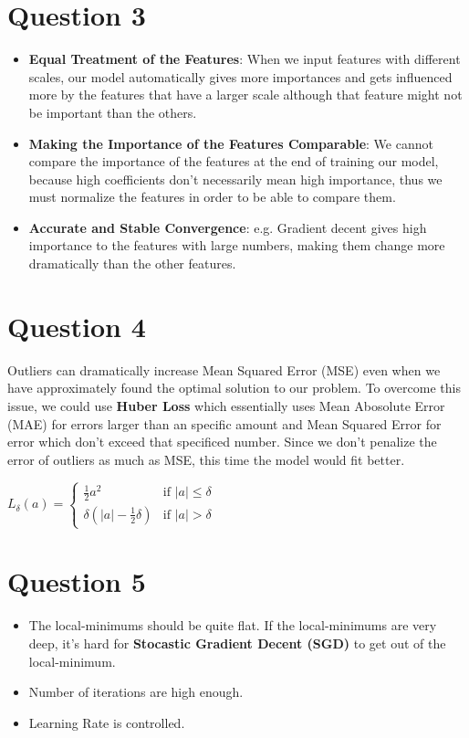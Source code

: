 \documentclass[a4paper,12pt]{article}
\begin{document}
\section*{Question 3}
\begin{itemize}
    \item \textbf{Equal Treatment of the Features}: When we input features with different scales, our model automatically gives more importances and gets influenced more by the features that 
    have a larger scale although that feature might not be important than the others. 
    \item \textbf{Making the Importance of the Features Comparable}: We cannot compare the importance of the features at the end of training our model, because high coefficients don't necessarily
    mean high importance, thus we must normalize the features in order to be able to compare them.
    \item \textbf{Accurate and Stable Convergence}: e.g. Gradient decent gives high importance to the features with large numbers, making them change more dramatically than the other features. 
\end{itemize}

\section*{Question 4}
Outliers can dramatically increase Mean Squared Error (MSE) even when we have approximately found the optimal solution to our problem. To overcome this issue, we could use \textbf{Huber Loss}
which essentially uses Mean Abosolute Error (MAE) for errors larger than an specific amount and Mean Squared Error for error which don't exceed that specificed number. Since we don't 
penalize the error of outliers as much as MSE, this time the model would fit better.

\( 
L_\delta(a) = 
\begin{cases} 
\frac{1}{2} a^2 & \text{if } |a| \leq \delta \\
\delta \left( |a| - \frac{1}{2} \delta \right) & \text{if } |a| > \delta 
\end{cases}
\)

\section*{Question 5}
\begin{itemize}
    \item The local-minimums should be quite flat. If the local-minimums are very deep, it's hard for \textbf{Stocastic Gradient Decent (SGD)} to get out of the local-minimum.
    \item Number of iterations are high enough.
    \item Learning Rate is controlled.  
\end{itemize}
\end{document}
